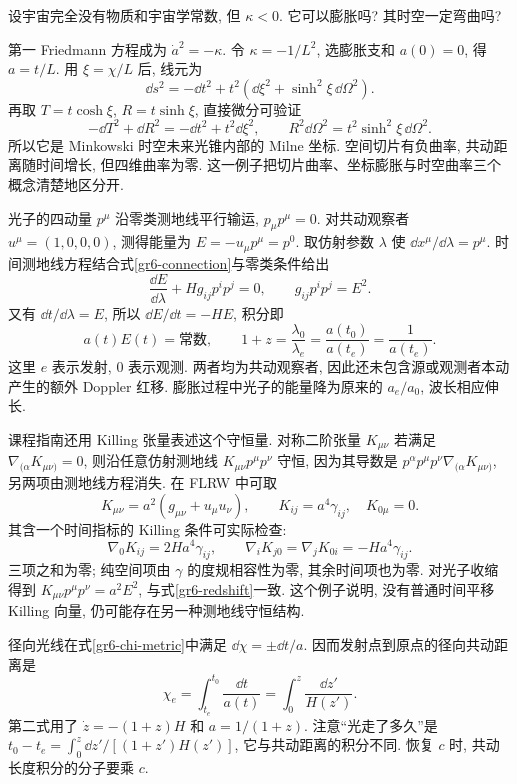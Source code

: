 \begin{example}
设宇宙完全没有物质和宇宙学常数, 但 $\kappa<0$. 它可以膨胀吗? 其时空一定弯曲吗?
\end{example}
\begin{solution}
第一 Friedmann 方程成为 $\dot a^2=-\kappa$. 令 $\kappa=-1/L^2$, 选膨胀支和 $a(0)=0$, 得 $a=t/L$. 用 $\xi=\chi/L$ 后, 线元为
\[
 \dd s^2=-\dd t^2+t^2(\dd\xi^2+\sinh^2\xi\,\dd\Omega^2).
\]
再取 $T=t\cosh\xi$, $R=t\sinh\xi$, 直接微分可验证
\[
 -\dd T^2+\dd R^2=-\dd t^2+t^2\dd\xi^2,
 \qquad R^2\dd\Omega^2=t^2\sinh^2\xi\,\dd\Omega^2.
\]
所以它是 Minkowski 时空未来光锥内部的 Milne 坐标. 空间切片有负曲率, 共动距离随时间增长, 但四维曲率为零. 这一例子把切片曲率、坐标膨胀与时空曲率三个概念清楚地区分开.
\end{solution}


光子的四动量 $p^\mu$ 沿零类测地线平行输运, $p_\mu p^\mu=0$. 对共动观察者 $u^\mu=(1,0,0,0)$, 测得能量为 $E=-u_\mu p^\mu=p^0$. 取仿射参数 $\lambda$ 使 $\dd x^\mu/\dd\lambda=p^\mu$. 时间测地线方程结合式\eqref{gr6-connection}与零类条件给出
\[
 \frac{\dd E}{\dd\lambda}+Hg_{ij}p^ip^j=0,
 \qquad g_{ij}p^ip^j=E^2.
\]
又有 $\dd t/\dd\lambda=E$, 所以 $\dd E/\dd t=-HE$, 积分即
\begin{equation}\label{gr6-redshift}
 a(t)E(t)=\text{常数},\qquad
 1+z=\frac{\lambda_0}{\lambda_e}=\frac{a(t_0)}{a(t_e)}=\frac1{a(t_e)}.
\end{equation}
这里 $e$ 表示发射, $0$ 表示观测. 两者均为共动观察者, 因此还未包含源或观测者本动产生的额外 Doppler 红移. 膨胀过程中光子的能量降为原来的 $a_e/a_0$, 波长相应伸长.

课程指南还用 Killing 张量表述这个守恒量. 对称二阶张量 $K_{\mu\nu}$ 若满足 $\nabla_{(\alpha}K_{\mu\nu)}=0$, 则沿任意仿射测地线 $K_{\mu\nu}p^\mu p^\nu$ 守恒, 因为其导数是 $p^\alpha p^\mu p^\nu\nabla_{(\alpha}K_{\mu\nu)}$, 另两项由测地线方程消失. 在 FLRW 中可取
\[
 K_{\mu\nu}=a^2(g_{\mu\nu}+u_\mu u_\nu),\qquad K_{ij}=a^4\gamma_{ij},\quad K_{0\mu}=0.
\]
其含一个时间指标的 Killing 条件可实际检查:
\[
 \nabla_0K_{ij}=2Ha^4\gamma_{ij},\qquad
 \nabla_iK_{j0}=\nabla_jK_{0i}=-Ha^4\gamma_{ij}.
\]
三项之和为零; 纯空间项由 $\gamma$ 的度规相容性为零, 其余时间项也为零. 对光子收缩得到 $K_{\mu\nu}p^\mu p^\nu=a^2E^2$, 与式\eqref{gr6-redshift}一致. 这个例子说明, 没有普通时间平移 Killing 向量, 仍可能存在另一种测地线守恒结构.


径向光线在式\eqref{gr6-chi-metric}中满足 $\dd\chi=\pm\dd t/a$. 因而发射点到原点的径向共动距离是
\begin{equation}\label{gr6-comoving-distance}
 \chi_e=\int_{t_e}^{t_0}\frac{\dd t}{a(t)}
       =\int_0^z\frac{\dd z'}{H(z')}.
\end{equation}
第二式用了 $\dot z=-(1+z)H$ 和 $a=1/(1+z)$. 注意“光走了多久”是 $t_0-t_e=\int_0^z\dd z'/[(1+z')H(z')]$, 它与共动距离的积分不同. 恢复 $c$ 时, 共动长度积分的分子要乘 $c$.

